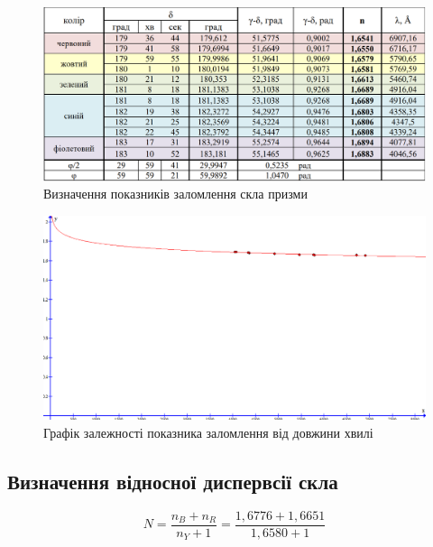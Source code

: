 \begin{figure}[ht]

\centering

\includegraphics[width=1\linewidth]{Pics/tabl3.png}

\caption{Визначення показників заломлення скла призми}

\label{Prac3}

\end{figure}

\begin{figure}[ht]

\centering

\includegraphics[width=0.9\linewidth]{Pics/tabl5.png}

\caption{Графік залежності показника заломлення від довжини хвилі}

\label{Prac3}

\end{figure}

\newpage
\subsection{Визначення відносної диспервсії скла}
$$N = \frac{n_B + n_R}{n_Y + 1} = \frac{1,6776 + 1,6651}{1,6580+1}$$

